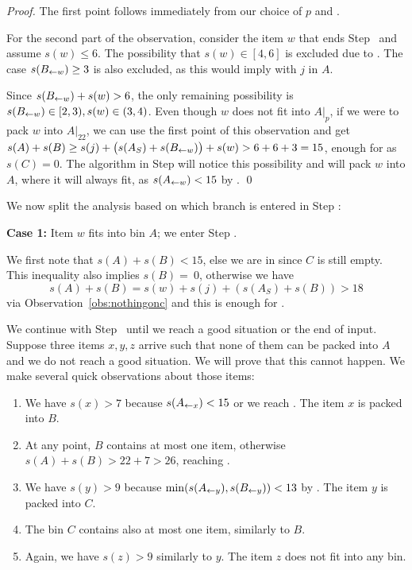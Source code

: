 \begin{proof}
The first point follows immediately from our choice of $p$ and .

For the second part of the observation, consider the item $w$ that
ends Step~ and assume $s(w) \le 6$. The possibility that
$s(w) \in  [4,6]$ is excluded due to . The case $s(B_{\leftarrow w}) \ge  3$ is
also excluded, as this would imply  with $j$ in $A$.

Since $s(B_{\leftarrow w}) + s(w) > 6$, the only remaining possibility is $s(B_{\leftarrow w}) \in  [2,3), s(w) \in 
(3,4)$. Even though $w$ does not fit into $A|_p$, if we were to pack
$w$ into $A|_{22}$, we can use the first point of this observation and get
$s(A) + s(B) \ge  s(j) + \big(s(A_S) + s(B_{\leftarrow w})\big) + s(w) > 6 + 6 + 3 = 15$, enough for  as $s(C) = 0$. The algorithm
 in Step  will notice this
possibility and will pack $w$ into $A$, where it will always fit, as
$s(A_{\leftarrow w}) < 15$ by . \qed

\end{proof}

We now split the analysis based on which branch is entered in Step :

\smallskip
\noindent
{\bf Case 1:} Item $w$ fits into bin $A$; we enter Step .

We first note that $s(A)+s(B)<15$, else we are in  since $C$ is still empty. This inequality also
implies $s(B) =~0$, otherwise we have
\[s(A) + s(B) = s(w) + s(j) + (s(A_S) +s(B)) > 18\]
via Observation~\ref{obs:nothingonc} and this is enough for .

We continue with Step~ until we reach a good situation or
the end of input.  Suppose three items $x,y,z$ arrive such that none of them 
can be packed into $A$ and we do not reach a good situation. We will prove that
this cannot happen. We make several quick observations about those items:

\begin{enumerate}
\item We have $s(x) > 7$ because $s(A_{\leftarrow x}) < 15$ or we reach . The item $x$ is packed into $B$.
\item At any point, $B$ contains at most one item, otherwise $s(A) + s(B) > 22 + 7 > 26$, reaching .
\item We have $s(y) > 9$ because $\min(s(A_{\leftarrow y}), s(B_{\leftarrow y})) < 13$ by . The item $y$ is packed into $C$.
\item The bin $C$ contains also at most one item, similarly to $B$.
\item Again, we have $s(z) > 9$ similarly to $y$. The item $z$ does not fit into any bin.
\end{enumerate}


